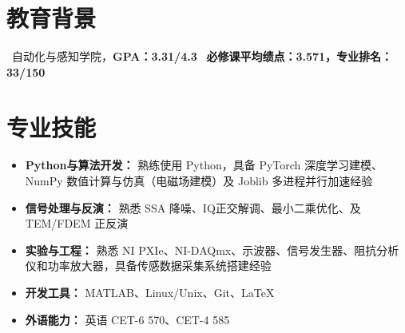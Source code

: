 \documentclass{resume}
\begin{document}



\section{教育背景}
\ 自动化与感知学院，\textbf{GPA：3.31/4.3}
\ \textbf{必修课平均绩点：3.571，专业排名：33/150}

\section{专业技能}
\begin{itemize}[parsep=0.2ex]
  \item \textbf{Python与算法开发：} 熟练使用 Python，具备 PyTorch 深度学习建模、NumPy 数值计算与仿真（电磁场建模）及 Joblib 多进程并行加速经验
  \item \textbf{信号处理与反演：} 熟悉 SSA 降噪、IQ正交解调、最小二乘优化、及 TEM/FDEM 正反演
  \item \textbf{实验与工程：} 熟悉 NI PXIe、NI-DAQmx、示波器、信号发生器、阻抗分析仪和功率放大器，具备传感数据采集系统搭建经验
  \item \textbf{开发工具：} MATLAB、Linux/Unix、Git、\LaTeX
  \item \textbf{外语能力：} 英语 CET-6 570、CET-4 585
\end{itemize}
\end{document}
